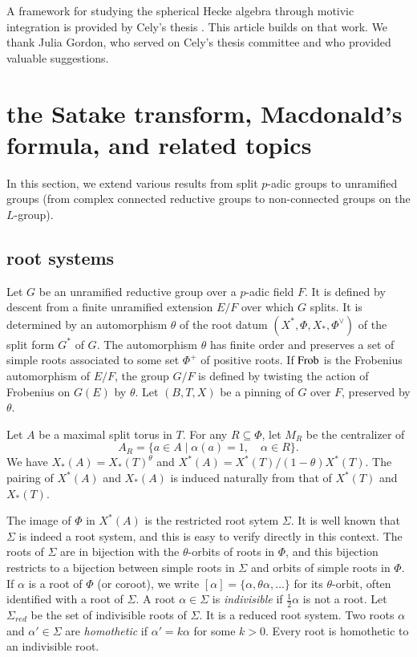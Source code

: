 A framework for studying the spherical Hecke algebra through motivic
integration is provided by Cely's thesis \cite{cely}.  This article
builds on that work.  We thank Julia Gordon, who served on Cely's
thesis committee and who provided valuable suggestions.



\section{the Satake transform, Macdonald's formula, and related topics}
\label{XX} %

In this section, we extend various results from split $p$-adic groups
to unramified groups (from complex connected reductive groups to
non-connected groups on the $L$-group).

\subsection{root systems}

Let $G$ be an unramified reductive group over a $p$-adic field $F$.
It is defined by descent from a finite unramified extension $E/F$ over
which $G$ splits.  It is determined by an automorphism $\theta$ of the
root datum $(X^*,\Phi,X_*,\Phi^\vee)$ of the split form $G^*$ of $G$.
The automorphism $\theta$ has finite order and preserves a set of
simple roots associated to some set $\Phi^+$ of positive roots.  If
${\operatorname{Frob}}$ is the Frobenius automorphism of $E/F$, the group $G/F$ is
defined by twisting the action of Frobenius on $G(E)$ by $\theta$.  Let
$(B,T,X)$ be a pinning of $G$ over $F$, preserved by $\theta$.

Let $A$ be a maximal split torus in $T$.  For any $R\subseteq \Phi$,
let $M_R$ be the centralizer of
\[
A_R = \{a\in A\mid \alpha(a)=1,\quad \alpha\in R\}.
\]
We have $X_*(A) = X_*(T)^\theta$ and $X^*(A) =
X^*(T)/(1-\theta)X^*(T)$.  The pairing of $X^*(A)$ and $X_*(A)$ is
induced naturally from that of $X^*(T)$ and $X_*(T)$.

The image of $\Phi$ in $X^*(A)$ is the restricted root sytem $\Sigma$.
It is well known that $\Sigma$ is indeed a root system, and this is
easy to verify directly in this context.  The roots of $\Sigma$ are in
bijection with the $\theta$-orbits of roots in $\Phi$, and this
bijection restricts to a bijection between simple roots in $\Sigma$
and orbits of simple roots in $\Phi$.  If $\alpha$ is a root of $\Phi$
(or coroot), we write $[\alpha]=\{\alpha,\theta\alpha,\ldots\}$ for
its $\theta$-orbit, often identified with a root of $\Sigma$.
A root $\alpha\in\Sigma$ is {\it indivisible} if $\frac12\alpha$ is not a root.
Let $\Sigma_{red}$ be the set of %
indivisible roots of $\Sigma$.  It is a reduced root system.
Two roots $\alpha$ and $\alpha'\in\Sigma$ are {\it homothetic} if
$\alpha' = k\alpha$ for some $k>0$.  Every root is homothetic to an
indivisible root.  %

